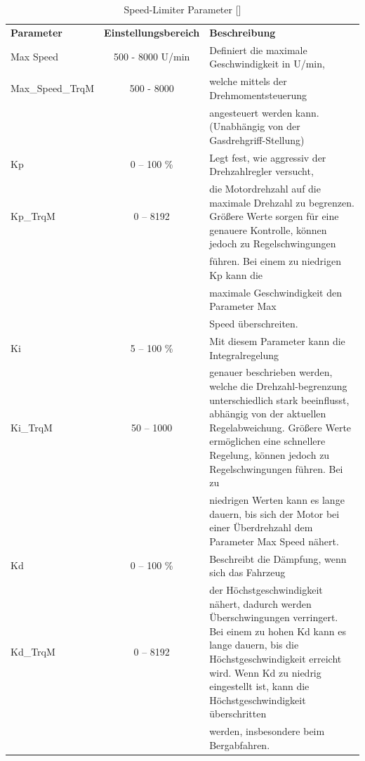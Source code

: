 \begin{table}[H]
	\begin{tabular}{|lcp{8cm}|}\hline
	\rowcolor[gray]{0.8}\textbf{Parameter} & \textbf{Einstellungsbereich} &\textbf{Beschreibung}\\[3pt]
		Max Speed & 500 - 8000 U/min & Definiert die maximale Geschwindigkeit in U/min,\\
		Max\_Speed\_TrqM & 500 - 8000	& welche mittels der Drehmomentsteuerung\\&& angesteuert werden kann. (Unabhängig von der Gasdrehgriff-Stellung)\\\hline
		Kp 	& 0 – 100 \% 	& Legt fest, wie aggressiv der Drehzahlregler versucht,\\
		Kp\_TrqM	& 0 – 8192			& die Motordrehzahl auf die maximale Drehzahl zu begrenzen. Größere Werte sorgen für eine genauere Kontrolle, können jedoch zu Regelschwingungen\\&& führen. Bei einem zu niedrigen Kp kann die\\&& maximale Geschwindigkeit den Parameter Max\\&& Speed überschreiten.\\\hline
		Ki 			& 5 – 100 \% 		& Mit diesem Parameter kann die Integralregelung\\
		Ki\_TrqM	& 50 – 1000 		& genauer beschrieben werden, welche die Drehzahl-begrenzung unterschiedlich stark beeinflusst, abhängig von der aktuellen Regelabweichung. Größere Werte ermöglichen eine schnellere Regelung, können jedoch zu Regelschwingungen führen. Bei zu\\&& niedrigen Werten kann es lange dauern, bis sich der Motor bei einer Überdrehzahl dem Parameter Max Speed nähert. \\\hline
		Kd    		& 0 – 100 \% 	& Beschreibt die Dämpfung, wenn sich das Fahrzeug\\
		Kd\_TrqM	& 0 – 8192	 	& der Höchstgeschwindigkeit nähert, dadurch werden Überschwingungen verringert. Bei einem zu hohen Kd kann es lange dauern, bis die Höchstgeschwindigkeit erreicht wird. Wenn Kd zu niedrig eingestellt ist, kann die Höchstgeschwindigkeit überschritten\\&& werden, insbesondere beim Bergabfahren. \\\hline	
	\end{tabular}	
	\caption{Speed-Limiter Parameter [\cite{Manual}]}
	\label{tab:Geschwindigkeitsbegrenzer-Parameter}
\end{table}

\newpage

